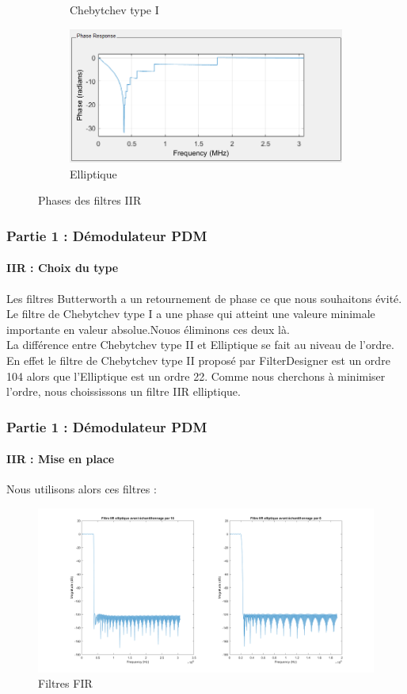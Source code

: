 \documentclass[
10pt,
aspectratio=169,
]{beamer}
\begin{document}
\begin{frame}
\begin{figure}
\begin{subfigure}{0.4\textwidth}
    \caption{Chebytchev type I}
    \label{fig:cheb2}
\end{subfigure}
\begin{subfigure}{0.4\textwidth}
    \includegraphics[scale=0.3]{Images/Phase_IIR_elliptic.PNG}
    \caption{Elliptique}
    \label{fig:ell}
\end{subfigure}
        
\caption{Phases des filtres IIR}
\label{fig:phases}
\end{figure}
\end{frame}

\begin{frame}
\frametitle{Partie 1 : Démodulateur PDM} 
\framesubtitle{IIR : Choix du type} 
Les filtres Butterworth a un retournement de phase ce que nous souhaitons évité. Le filtre de Chebytchev type I a une phase qui atteint une valeure minimale importante en valeur absolue.Nouos éliminons ces deux là.\\
La différence entre Chebytchev type II et Elliptique se fait au niveau de l'ordre. En effet le filtre de Chebytchev type II proposé par FilterDesigner est un ordre 104 alors que l'Elliptique est un ordre 22. Comme nous cherchons à minimiser l'ordre, nous choississons un filtre IIR elliptique.
\end{frame}

\begin{frame}
\frametitle{Partie 1 : Démodulateur PDM} 
\framesubtitle{IIR : Mise en place} 
Nous utilisons alors ces filtres : 
\begin{figure}[h]
    \centering
    \includegraphics[scale=0.2]{Images/IIR.png}
    \caption{Filtres FIR}
    \label{fig:FIR}
\end{figure}
\end{frame}
\end{document}
